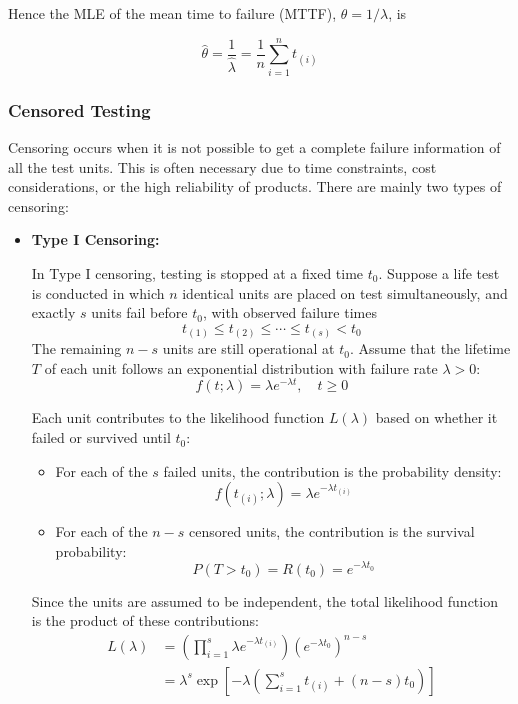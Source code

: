 \documentclass[twoside]{book}
\begin{document}
Hence the MLE of the mean time to failure (MTTF), \(\theta = 1/\lambda\), is
\begin{textbox}
\[
\hat{\theta}
= \frac{1}{\hat{\lambda}}
= \frac{1}{n} \sum_{i=1}^n t_{(i)}
\]
\end{textbox}


\subsubsection{Censored Testing}

Censoring occurs when it is not possible to get a complete failure information of all the test units. This is often necessary due to time constraints, cost considerations, or the high reliability of products. There are mainly two types of censoring:

\begin{itemize}
  \item \textbf{Type I Censoring:}

  \medskip

    In Type I censoring, testing is stopped at a fixed time \(t_0\). Suppose a life test is conducted in which $n$ identical units are placed on test simultaneously, and exactly $s$ units fail before $t_0$, with observed failure times
      \[
      t_{(1)} \le t_{(2)} \le \cdots \le t_{(s)} < t_0
      \]
    The remaining $n - s$ units are still operational at $t_0$. Assume that the lifetime $T$ of each unit follows an exponential distribution with failure rate $\lambda > 0$:
    \[
    f(t; \lambda) = \lambda e^{-\lambda t}, \quad t \ge 0
    \]

    Each unit contributes to the likelihood function $L(\lambda)$ based on whether it failed or survived until $t_0$:

    \begin{itemize}
      \item For each of the $s$ failed units, the contribution is the probability density:
      \[
      f(t_{(i)}; \lambda) = \lambda e^{-\lambda t_{(i)}}
      \]

      \item For each of the $n - s$ censored units, the contribution is the survival probability:
      \[
      P(T > t_0) = R(t_0) = e^{-\lambda t_0}
      \]
    \end{itemize}

    Since the units are assumed to be independent, the total likelihood function is the product of these contributions:
    \begin{align*}
    L(\lambda)
      &= \left( \prod_{i=1}^s \lambda e^{-\lambda t_{(i)}} \right)
         \left( e^{-\lambda t_0} \right)^{n - s} \\
      &= \lambda^s \exp\left[-\lambda \left( \sum_{i=1}^s t_{(i)} + (n - s)t_0 \right) \right]
    \end{align*}


\end{itemize}
\end{document}
